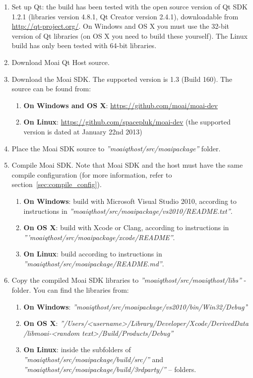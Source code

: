 \begin{enumerate}
\item Set up Qt: the build has been tested with the open source version of Qt SDK 1.2.1 (libraries version 4.8.1, Qt Creator version 2.4.1), downloadable from \url{http://qt-project.org/}. On Windows and OS X you must use the 32-bit version of Qt libraries (on OS X you need to build these yourself). The Linux build has only been tested with 64-bit libraries.

\item Download Moai Qt Host source.

\item Download the Moai SDK. The supported version is 1.3 (Build 160). The source can be found from:
	\begin{enumerate}
	\item \textbf{On Windows and OS X}: \url{https://github.com/moai/moai-dev}
	\item \textbf{On Linux}: \url{https://github.com/spacepluk/moai-dev} (the supported version is dated at January 22nd 2013)
	\end{enumerate}
	
\item Place the Moai SDK source to \textit{''moaiqthost/src/moaipackage''} folder.

\item Compile Moai SDK. Note that Moai SDK and the host must have the same compile configuration (for more information, refer to section~\ref{sec:compile_config}).
	\begin{enumerate}
	\item \textbf{On Windows}: build with Microsoft Visual Studio 2010, according to instructions in \textit{''moaiqthost/src/moaipackage/vs2010/README.txt''}.
	\item \textbf{On OS X}: build with Xcode or Clang, according to instructions in\\ \textit{'''moaiqthost/src/moaipackage/xcode/README''}.
	\item \textbf{On Linux}: build according to instructions in\\ \textit{''moaiqthost/src/moaipackage/README.md''}.
	\end{enumerate}
	
\item Copy the compiled Moai SDK libraries to \textit{''moaiqthost/src/moaiqthost/libs''} -folder. You can find the libraries from:
	\begin{enumerate}
	\item \textbf{On Windows}: \textit{''moaiqthost/src/moaipackage/vs2010/bin/Win32/Debug'}'
	\item \textbf{On OS X}: \textit{''/Users/<username>/Library/Developer/Xcode/DerivedData\\/libmoai-<random text>/Build/Products/Debug''}
	\item \textbf{On Linux}: inside the subfolders of  \textit{''moaiqthost/src/moaipackage/build/src/''} and \textit{''moaiqthost/src/moaipackage/build/3rdparty/''} -- folders.
	\end{enumerate}
	

\end{enumerate}
